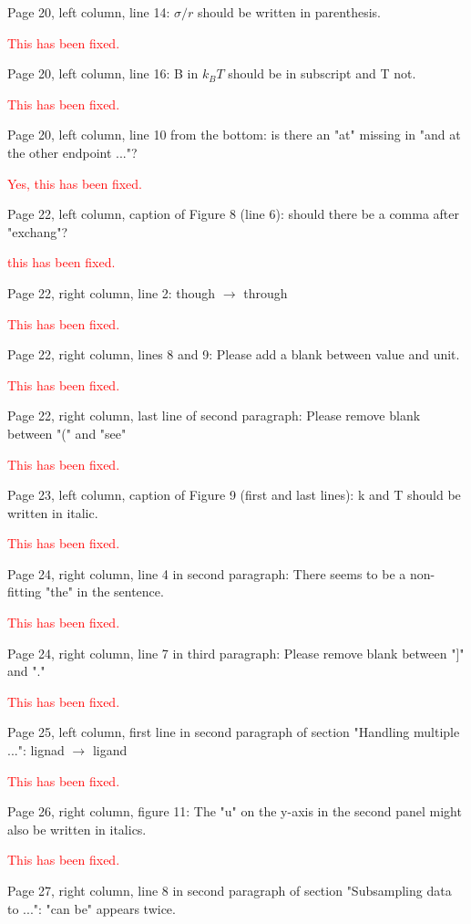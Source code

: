 \documentclass[11pt,a4paper]{letter} %
\begin{document}
\begin{letter}
Page 20, left column, line 14: $\sigma/r$ should be written in parenthesis.

\textcolor{red}{This has been fixed.}

Page 20, left column, line 16: B in $k_{B}T$ should be in subscript and T not.

\textcolor{red}{This has been fixed.}

Page 20, left column, line 10 from the bottom: is there an "at" missing in "and at the other endpoint ..."?

\textcolor{red}{ Yes, this has been fixed.}

Page 22, left column, caption of Figure 8 (line 6): should there be a comma after "exchang"?

\textcolor{red}{this has been fixed.}

Page 22, right column, line 2: though $\rightarrow$ through

\textcolor{red}{This has been fixed.}

Page 22, right column, lines 8 and 9: Please add a blank between value and unit.

\textcolor{red}{This has been fixed.}

Page 22, right column, last line of second paragraph: Please remove blank between "(" and "see"

\textcolor{red}{This has been fixed.}

Page 23, left column, caption of Figure 9 (first and last lines): k and T should be written in italic.

\textcolor{red}{This has been fixed.}

Page 24, right column, line 4 in second paragraph: There seems to be a non-fitting "the" in the sentence.

\textcolor{red}{This has been fixed.}

Page 24, right column, line 7 in third paragraph: Please remove blank between "]" and "."

\textcolor{red}{This has been fixed.}

Page 25, left column, first line in second paragraph of section "Handling multiple ...": lignad  $\rightarrow$ ligand

\textcolor{red}{This has been fixed.}

Page 26, right column, figure 11: The "u" on the y-axis in the second panel might also be written in italics.

\textcolor{red}{This has been fixed.}

Page 27, right column, line 8 in second paragraph of section "Subsampling data to ...": "can be" appears twice.


\end{letter}
\end{document}
